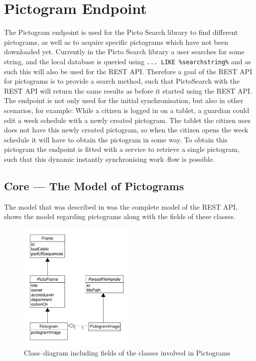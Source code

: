 \section{Pictogram Endpoint}\label{sec:pictogramendpoint}
\begin{center}
\end{center}

The Pictogram endpoint is used for the Picto Search library to find different pictograms, as well as to acquire specific pictograms which have not been downloaded yet.
Currently in the Picto Search library a user searches for some string, and the local database is queried using \texttt{... LIKE \%searchstring\%} and as such this will also be used for the REST API.
Therefore a goal of the REST API for pictograms is to provide a search method, such that PictoSearch with the REST API will return the same results as before it started using the REST API.
The endpoint is not only used for the initial synchronisation, but also in other scenarios, for example:
While a citizen is logged in on a tablet, a guardian could edit a week schedule with a newly created pictogram.
The tablet the citizen uses does not have this newly created pictogram, so when the citizen opens the week schedule it will have to obtain the pictogram in some way.
To obtain this pictogram the endpoint is fitted with a service to retrieve a single pictogram, such that this dynamic instantly synchronising work--flow is possible.

\subsection{Core --- The Model of Pictograms}\label{subsec:pictomodel}
The model that was described in  was the complete model of the REST API,  shows the model regarding pictograms along with the fields of these classes.

\begin{figure}[!htb]
    \centering
    \includegraphics[width=0.50\textwidth]{figures/pictogrammodel.pdf}
    \caption{Class--diagram including fields of the classes involved in Pictograms}\label{fig:pictogramModel}
\end{figure}

